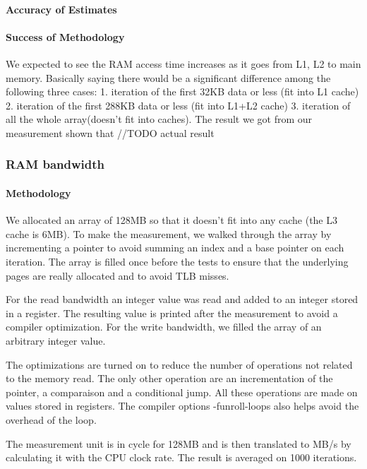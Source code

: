 \paragraph{Accuracy of Estimates}
\paragraph{Success of Methodology}
We expected to see the RAM access time increases as it goes from L1, L2 to main memory. Basically saying there would be a significant difference among the following three cases: 
1. iteration of the first 32KB data or less (fit into L1 cache)
2. iteration of the first 288KB data or less (fit into L1+L2 cache)
3. iteration of all the whole array(doesn’t fit into caches).
The result we got from our measurement shown that //TODO actual result






\subsubsection{RAM bandwidth}
\paragraph{Methodology}
We allocated an array of 128MB so that it doesn't fit into any cache (the L3 cache is 6MB).
To make the measurement, we walked through the array by incrementing a pointer to avoid summing an index and a base pointer on each iteration.
The array is filled once before the tests to ensure that the underlying pages are really allocated and to avoid TLB misses.


For the read bandwidth an integer value was read and added to an integer stored in a register.
The resulting value is printed after the measurement to avoid a compiler optimization.
For the write bandwidth, we filled the array of an arbitrary integer value.

The optimizations are turned on to reduce the number of operations not related to the memory read.
The only other operation are an incrementation of the pointer, a comparaison and a conditional jump.
All these operations are made on values stored in registers.
The compiler options -funroll-loops also helps avoid the overhead of the loop.

The measurement unit is in cycle for 128MB and is then translated to MB/s by calculating it with the CPU clock rate.
The result is averaged on 1000 iterations.

